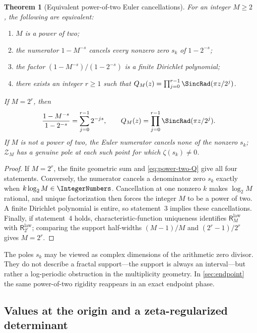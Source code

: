 \documentclass[11pt,oneside]{article}
\newtheorem{theorem}{Theorem}[section]
\theoremstyle{definition}
\theoremstyle{remark}
\newcommand{\ReciprocalIntegerLaw}[1]{\mathsf R^{\mathrm{law}}_{#1}}
\begin{document}
\begin{theorem}[Equivalent power-of-two Euler cancellations]
\label{thm:power-two-poles}
For an integer $M\ge2$, the following are equivalent:
\begin{enumerate}
\item $M$ is a power of two;
\item the numerator $1-M^{-s}$ cancels every nonzero zero $s_k$ of $1-2^{-s}$;
\item the factor $(1-M^{-s})/(1-2^{-s})$ is a finite Dirichlet polynomial;
\item there exists an integer $r\ge1$ such that
$Q_M(z)=\prod_{j=0}^{r-1}\SincRad(\pi z/2^j)$.
\end{enumerate}
If $M=2^r$, then
\begin{equation}
 \frac{1-M^{-s}}{1-2^{-s}}=\sum_{j=0}^{r-1}2^{-js},
 \qquad
 Q_M(z)=\prod_{j=0}^{r-1}\SincRad(\pi z/2^j).
 \label{eq:power-two-equivalences}
\end{equation}
If $M$ is not a power of two, the Euler numerator cancels none of the nonzero $s_k$;
$\mathcal Z_M$ has a genuine pole at each such point for which $\zeta(s_k)\ne0$.
\end{theorem}

\begin{proof}
If $M=2^r$, the finite geometric sum and \eqref{eq:power-two-Q} give all four
statements.  Conversely, the numerator cancels a denominator zero $s_k$ exactly when
$k\log_2M\in\IntegerNumbers$.  Cancellation at one nonzero $k$ makes $\log_2M$ rational, and
unique factorization then forces the integer $M$ to be a power of two.  A finite Dirichlet
polynomial is entire, so statement~3 implies these cancellations.  Finally, if statement~4
holds, characteristic-function uniqueness identifies $\ReciprocalIntegerLaw{M}$ with $\ReciprocalIntegerLaw{2^r}$; comparing
the support half-widths $(M-1)/M$ and $(2^r-1)/2^r$ gives $M=2^r$.
\end{proof}

The poles $s_k$ may be viewed as complex dimensions of the arithmetic zero divisor.  They
do not describe a fractal support---the support is always an interval---but rather a log-periodic
obstruction in the multiplicity geometry.  In \cref{sec:endpoint} the same power-of-two
rigidity reappears in an exact endpoint phase.

\subsection{Values at the origin and a zeta-regularized determinant}
\end{document}
